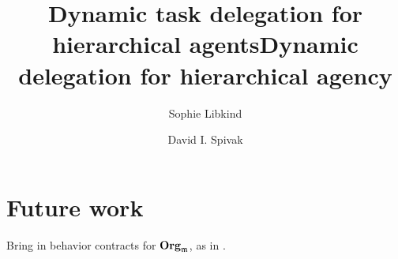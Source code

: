 \documentclass[11pt, one side, article]{memoir}
\begin{document}
\title{Dynamic task delegation for hierarchical agents}
\title{Dynamic delegation for hierarchical agency}

\author{
	Sophie Libkind\and
	David I. Spivak
}


\maketitle

\begin{abstract}

\end{abstract}








\chapter{Future work}


Bring in behavior contracts for $\mathbf{Org}_{\mathfrak{m}}$, as in \cite{schultz2016dynamical,spivak2021learners}.

\printbibliography
\end{document}
